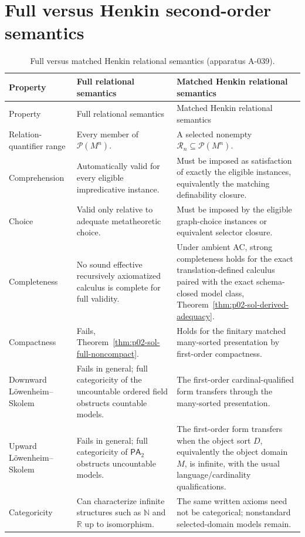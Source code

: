 \section{Full versus Henkin second-order semantics}
\label{sec:p02-sol-comparison}

\begin{landscape}
\begingroup\scriptsize\setlength{\tabcolsep}{4pt}
\begin{longtable}{@{}p{1.35in}p{2.95in}p{2.95in}@{}}
\caption{Full versus matched Henkin relational semantics (apparatus A-039).}
\label{tab:p02-full-vs-henkin-sol}\\
\toprule
Property & Full relational semantics & Matched Henkin relational semantics \\ \midrule
\endfirsthead
\toprule
Property & Full relational semantics & Matched Henkin relational semantics \\ \midrule
\endhead
Relation-quantifier range & Every member of \(\mathcal P(M^n)\). & A selected nonempty \(\mathcal R_n\subseteq\mathcal P(M^n)\). \\
\addlinespace
Comprehension & Automatically valid for every eligible impredicative instance. & Must be imposed as satisfaction of exactly the eligible instances, equivalently the matching definability closure. \\
\addlinespace
Choice & Valid only relative to adequate metatheoretic choice. & Must be imposed by the eligible graph-choice instances or equivalent selector closure. \\
\addlinespace
Completeness & No sound effective recursively axiomatized calculus is complete for full validity. & Under ambient AC, strong completeness holds for the exact translation-defined calculus paired with the exact schema-closed model class, Theorem~\ref{thm:p02-sol-derived-adequacy}. \\
\addlinespace
Compactness & Fails, Theorem~\ref{thm:p02-sol-full-noncompact}. & Holds for the finitary matched many-sorted presentation by first-order compactness. \\
\addlinespace
Downward L\"owenheim--Skolem & Fails in general; full categoricity of the uncountable ordered field obstructs countable models. & The first-order cardinal-qualified form transfers through the many-sorted presentation. \\
\addlinespace
Upward L\"owenheim--Skolem & Fails in general; full categoricity of \(\mathsf{PA}_2\) obstructs uncountable models. & The first-order form transfers when the object sort \(D\), equivalently the object domain \(M\), is infinite, with the usual language/cardinality qualifications. \\
\addlinespace
Categoricity & Can characterize infinite structures such as \(\mathbb N\) and \(\mathbb R\) up to isomorphism. & The same written axioms need not be categorical; nonstandard selected-domain models remain. \\
\bottomrule
\end{longtable}
\endgroup
\end{landscape}

